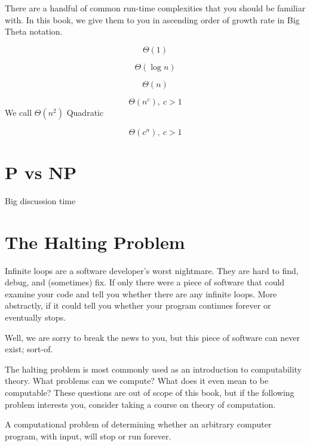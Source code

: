 \documentclass[main.tex]{subfiles}
\begin{document}
There are a handful of common run-time complexities that you should be familiar with. In this book, we give them to you in ascending order of growth rate in Big Theta notation.

\begin{defn}[Constant]
	\[\Theta(1)\]
\end{defn}

\begin{defn}[Logarithmic]
	\[\Theta(\log n)\]
\end{defn}

\begin{defn}[Linear]
	\[\Theta(n)\]
\end{defn}

\begin{defn}[Polynomial]
	\[\Theta(n^c),\ c > 1\]
	We call \(\Theta(n^2)\) Quadratic
\end{defn}

\begin{defn}[Exponential]
	\[\Theta(c^n),\ c > 1\]
\end{defn}

\section{P vs NP}

Big discussion time %

\section{The Halting Problem}

Infinite loops are a software developer's worst nightmare. They are hard to find, debug, and (sometimes) fix. If only there were a piece of software that could examine your code and tell you whether there are any infinite loops. More abstractly, if it could tell you whether your program continues forever or eventually stops.

Well, we are sorry to break the news to you, but this piece of software can never exist; sort-of.

The halting problem is most commonly used as an introduction to computability theory. What problems can we compute? What does it even mean to be computable? These questions are out of scope of this book, but if the following problem interests you, consider taking a course on theory of computation.

\begin{defn}
	A computational problem of determining whether an arbitrary computer program, with input, will stop or run forever.
\end{defn}
\end{document}
